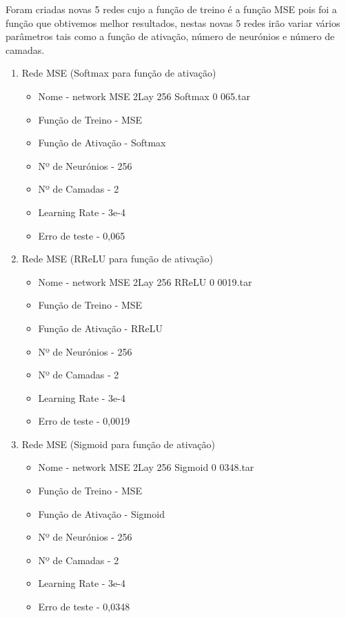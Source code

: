 \documentclass[10pt]{article}
\begin{document}
Foram criadas novas 5 redes cujo a função de treino é a função MSE pois foi
a função que obtivemos melhor resultados, nestas novas 5 redes irão variar vários parâmetros
tais como a função de ativação, número de neurónios e número de camadas.

\vspace{1cm}
\begin{enumerate}
  \item Rede MSE (Softmax para função de ativação)
  \begin{itemize}
    \item Nome - network MSE 2Lay 256 Softmax 0 065.tar
    \item Função de Treino - MSE
    \item Função de Ativação - Softmax
    \item Nº de Neurónios - 256
    \item Nº de Camadas - 2
    \item Learning Rate - 3e-4
    \item Erro de teste - 0,065
  \end{itemize}
  \newpage
  \item Rede MSE (RReLU para função de ativação)
  \begin{itemize}
    \item Nome - network MSE 2Lay 256 RReLU 0 0019.tar
    \item Função de Treino - MSE
    \item Função de Ativação - RReLU
    \item Nº de Neurónios - 256
    \item Nº de Camadas - 2
    \item Learning Rate - 3e-4
    \item Erro de teste - 0,0019
  \end{itemize}
  \vspace{1cm}
  \item Rede MSE (Sigmoid para função de ativação)
  \begin{itemize}
    \item Nome - network MSE 2Lay 256 Sigmoid 0 0348.tar
    \item Função de Treino - MSE
    \item Função de Ativação - Sigmoid
    \item Nº de Neurónios - 256
    \item Nº de Camadas - 2
    \item Learning Rate - 3e-4
    \item Erro de teste - 0,0348

\end{itemize}
\end{enumerate}
\end{document}
